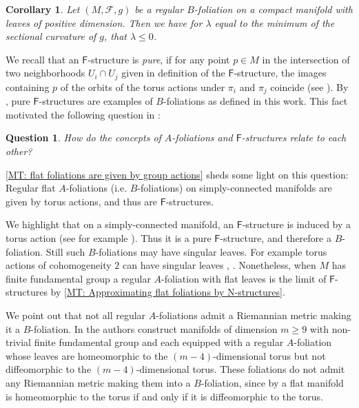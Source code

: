 \documentclass[12pt,a4paper,reqno]{amsart}
\newtheorem{mcorollary}[mtheorem]{Corollary}
\newtheorem{question}{Question}
\theoremstyle{definition}
\numberwithin{equation}{section}
\newcommand{\fol}{\mathcal{F}}
\newcommand{\F}{\mathsf{F}}
\begin{document}
\begin{mcorollary}
Let $(M,\fol,g)$ be a regular $B$-foliation on a compact manifold with leaves of positive dimension. Then we have for $\lambda$ equal to the minimum of the sectional curvature of $g$, that $\lambda\leq 0$.
\end{mcorollary}

We recall that an $\F$-structure is \emph{pure}, if for any point $p\in M$ in the intersection  of two neighborhoods $U_i\cap U_j$ given in  definition of the $\F$-structure, the images containing $p$ of the orbits of the torus actions under $\pi_i$ and $\pi_j$ coincide (see \cite[p. 228]{Fukaya1990}). By \cite{CheegerGromov1986}, pure $\F$-structures are examples of $B$-foliations as defined in this work. This fact motivated the following question in \cite{GalazGarciaRadeschi2015}:

\begin{question}
How do the concepts of $A$-foliations and $\F$-structures relate to each other?
\end{question}

\th\ref{MT: flat foliations are given by group actions}  sheds some light on this question: Regular flat $A$-foliations (i.e. $B$-foliations) on simply-con\-nec\-ted manifolds are given by torus actions, and thus are $\F$-structures.

We highlight that on a simply-connected manifold, an $\F$-structure is induced by a torus action (see for example \cite[Proposition 3.1, Lemma 3.2 and Lemma 4.1]{Rong1996}). Thus it is a pure $\F$-structure, and therefore a $B$-foliation. Still such $B$-foliations may have singular leaves. For example torus actions of cohomogeneity $2$ can have singular leaves \cite{Oh1983}, \cite{Corro2023}. Nonetheless, when $M$ has finite fundamental group  a regular $A$-foliation with flat leaves is the limit of $\F$-structures by \th\ref{MT: Approximating flat foliations by N-structures}.

We point out that not all regular $A$-foliations admit a Riemannian metric making it a $B$-foliation. In \cite{FarrellWu2019} the authors construct manifolds of dimension $m\geq 9$ with non-trivial finite fundamental group and each equipped with a regular $A$-foliation whose leaves are homeomorphic to the $(m-4)$-dimensional torus but not diffeomorphic to the $(m-4)$-dimensional torus. These foliations do not admit any Riemannian metric making them into a $B$-foliation, since by  \cite{Bieberbach} a flat  manifold is homeomorphic to the torus if and only if it is diffeomorphic to the torus. 
\end{document}
